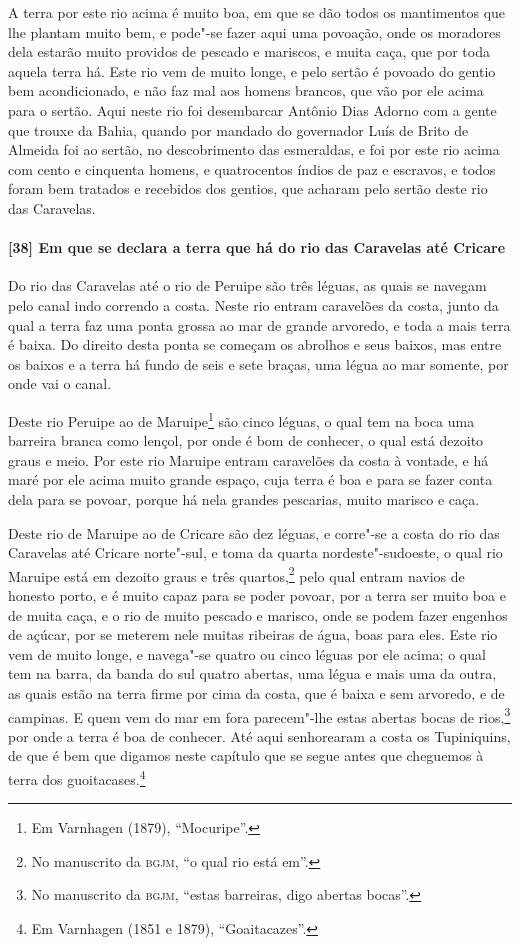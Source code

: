 \begin{linenumbers}
A terra por este rio acima é muito boa, em que se dão todos os mantimentos que lhe plantam
muito bem, e pode"-se fazer aqui uma povoação, onde os moradores dela estarão muito
providos de pescado e mariscos, e muita caça, que por toda aquela terra há. Este rio vem
de muito longe, e pelo sertão é povoado do gentio bem acondicionado, e não faz mal aos
homens brancos, que vão por ele acima para o sertão. Aqui neste rio foi desembarcar
Antônio Dias Adorno com a gente que trouxe da Bahia, quando por mandado do governador Luís
de Brito de Almeida foi ao sertão, no descobrimento das esmeraldas, e foi por este rio
acima com cento e cinquenta homens, e quatrocentos índios de paz e escravos, e todos foram
bem tratados e recebidos dos gentios, que acharam pelo sertão deste rio das Caravelas.

\paragraph{[38] Em que se declara a terra que há do rio das Caravelas até Cricare} \quad
Do rio das Caravelas até o rio de Peruipe são três léguas, as quais se navegam pelo canal
indo correndo a costa. Neste rio entram caravelões da costa, junto da qual a terra faz uma
ponta grossa ao mar de grande arvoredo, e toda a mais terra é baixa. Do direito desta
ponta se começam os abrolhos e seus baixos, mas entre os baixos e a terra há fundo de seis
e sete braças, uma légua ao mar somente, por onde vai o canal.

Deste rio Peruipe ao de Maruipe\footnote{ Em Varnhagen (1879), ``Mocuripe''.} são cinco
léguas, o qual tem na boca uma barreira branca como lençol, por onde é bom de conhecer, o
qual está dezoito graus e meio. Por este rio Maruipe entram caravelões da costa à vontade,
e há maré por ele acima muito grande espaço, cuja terra é boa e para se fazer conta dela
para se povoar, porque há nela grandes pescarias, muito marisco e caça.

Deste rio de Maruipe ao de Cricare são dez léguas, e corre"-se a costa do rio das Caravelas
até Cricare norte"-sul, e toma da quarta nordeste"-sudoeste, o qual rio Maruipe está em
dezoito graus e três quartos,\footnote{ No manuscrito da \textsc{bgjm}, ``o qual rio está
em''.} pelo qual entram navios de honesto porto, e é muito capaz para se poder povoar, por
a terra ser muito boa e de muita caça, e o rio de muito pescado e marisco, onde se podem
fazer engenhos de açúcar, por se meterem nele muitas ribeiras de água, boas para eles.
Este rio vem de muito longe, e navega"-se quatro ou cinco léguas por ele acima; o qual tem
na barra, da banda do sul quatro abertas, uma légua e mais uma da outra, as quais estão na
terra firme por cima da costa, que é baixa e sem arvoredo, e de campinas. E quem vem do
mar em fora parecem"-lhe estas abertas bocas de rios,\footnote{ No manuscrito da
\textsc{bgjm}, ``estas barreiras, digo abertas bocas''.} por onde a terra é boa de
conhecer. Até aqui senhorearam a costa os Tupiniquins, de que é bem que digamos neste
capítulo que se segue antes que cheguemos à terra dos guoitacases.\footnote{ Em Varnhagen
(1851 e 1879), ``Goaitacazes''.}


\end{linenumbers}
